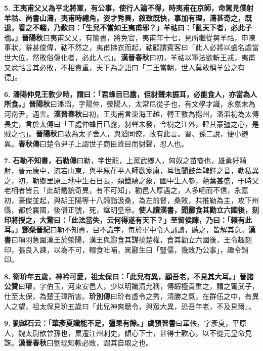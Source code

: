 \textbf{5.} \textbf{王夷甫父乂為平北將軍，有公事，使行人論不得，時夷甫在京師，命駕見僕射羊祜、尚書山濤，夷甫時總角，姿才秀異，敘致既快，事加有理，濤甚奇之，既退，看之不輟，乃歎曰：「生兒不當如王夷甫邪？」羊祜曰：「亂天下者，必此子也。」}{\footnotesize \textbf{晉陽秋}曰夷甫父乂，有簡書，將免官，夷甫年十七，見所繼從舅羊祜，申陳事狀，辭甚俊偉，祜不然之，夷甫拂衣而起，祜顧謂賓客曰「此人必將以盛名處當世大位，然敗俗傷化者，必此人也」。\textbf{漢晉春秋}曰初，羊祜以軍法欲斬王戎，夷甫又忿祜言其必敗，不相貴重，天下為之語曰「二王當朝，世人莫敢稱羊公之有德」。}

\textbf{6.} \textbf{潘陽仲見王敦少時，謂曰：「君蜂目已露，但豺聲未振耳，必能食人，亦當為人所食。」}{\footnotesize \textbf{晉陽秋}曰潘滔，字陽仲，滎陽人，太常尼從子也，有文學才識，永嘉末為河南尹，遇害。\textbf{漢晉春秋}曰初，王夷甫言東海王越，轉王敦為揚州，潘滔初為太傅長史，言於太傅曰「王處仲蜂目已露，豺聲未發，今樹之江外，肆其豪彊之心，是賊之也」。\textbf{晉陽秋}曰敦為太子舍人，與滔同僚，故有此言。習、孫二說，便小遷異。\textbf{春秋傳}曰楚令尹子上謂世子商臣蜂目而豺聲，忍人也。}

\textbf{7.} \textbf{石勒不知書，}{\footnotesize \textbf{石勒傳}曰勒，字世龍，上黨武鄉人，匈奴之苗裔也，雄勇好騎射，晉元康中，流宕山東，與平原茌平人師歡家庸，耳恆聞鼓角鞞鐸之音，勒私異之，初，勒鄉里原上地中生石日長，類鐵騎之象，國中生人參，葩葉甚盛，于時父老相者皆云「此胡體貌奇異，有不可知」，勸邑人厚遇之，人多哂而不信，永嘉初，豪傑並起，與胡王陽等十八騎詣汲桑，為左前督，桑敗，共推勒為主，攻下州縣，都於襄國，後僭正號，死，諡明皇帝。}\textbf{使人讀漢書，聞酈食其勸立六國後，刻印將授之，大驚曰：「此法當失，云何得遂有天下？」至留侯諫，乃曰：「賴有此耳。」}{\footnotesize \textbf{鄧粲晉紀}曰勒不知書，目不識字，毎於軍中令人誦讀，聽之，皆解其意。\textbf{漢書}曰項羽急圍漢王於滎陽，漢王與酈食其謀撓楚權，食其勸立六國後，王令趣刻印，張良入諫，以為不可，輟食吐哺，駡酈生曰「豎儒，幾敗乃公事」，趣令銷印。}

\textbf{8.} \textbf{衛玠年五歲，神衿可愛，祖太保曰：「此兒有異，顧吾老，不見其大耳。」}{\footnotesize \textbf{晉諸公贊}曰瓘，字伯玉，河東安邑人，少以明識清允稱，傅嘏極貴重之，謂之甯武子，仕至太保，為楚王瑋所害。\textbf{玠別傳}曰玠有虛令之秀，清勝之氣，在群伍之中，有異人之望，祖太保見玠五歲曰「此兒神爽聰令，與眾大異，恐吾年老，不及見爾」。}

\textbf{9.} \textbf{劉越石云：「華彥夏識能不足，彊果有餘。」}{\footnotesize \textbf{虞預晉書}曰華軼，字彥夏，平原人，魏太尉歆曾孫也，累遷江州刺史，傾心下士，甚得士歡心，以不從元皇命見誅。\textbf{漢晉春秋}曰劉琨知軼必敗，謂其自取之也。}

